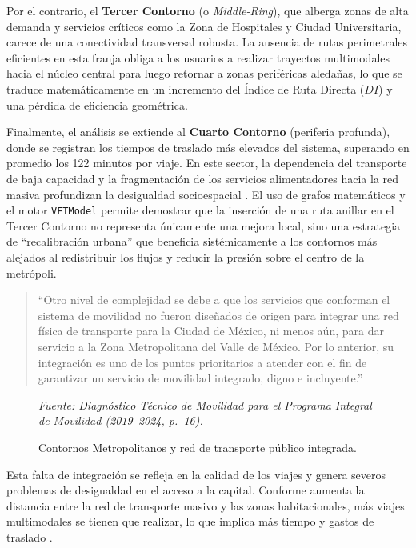 Por el contrario, el \textbf{Tercer Contorno} (o \textit{Middle-Ring}), que alberga zonas de alta demanda y 
servicios críticos como la Zona de Hospitales y Ciudad Universitaria, carece de una conectividad transversal robusta. 
La ausencia de rutas perimetrales eficientes en esta franja obliga a los usuarios a realizar trayectos multimodales hacia el núcleo central
para luego retornar a zonas periféricas aledañas, lo que se traduce matemáticamente en un incremento del Índice de Ruta Directa ($DI$) 
y una pérdida de eficiencia geométrica.

Finalmente, el análisis se extiende al \textbf{Cuarto Contorno} (periferia profunda), donde se registran los tiempos de traslado más elevados del sistema, 
superando en promedio los 122 minutos por viaje. En este sector, la dependencia del transporte de baja capacidad y la fragmentación de los servicios alimentadores 
hacia la red masiva profundizan la desigualdad socioespacial \textcite{semovi2020diagnostico}. El uso de grafos matemáticos y el motor \texttt{VFTModel} 
permite demostrar que la inserción de una ruta anillar en el Tercer Contorno no representa únicamente una mejora local, sino una estrategia de ``recalibración urbana''
que beneficia sistémicamente a los contornos más alejados al redistribuir los flujos y reducir la presión sobre el centro de la metrópoli.


\begin{quote}
``Otro nivel de complejidad se debe a que los servicios que conforman el sistema de
movilidad no fueron diseñados de origen para integrar una red física de transporte
para la Ciudad de México, ni menos aún, para dar servicio a la Zona Metropolitana
del Valle de México. Por lo anterior, su integración es uno de los puntos prioritarios
a atender con el fin de garantizar un servicio de movilidad integrado, digno e
incluyente.'' \parencite[p.~XX]{semovi2020diagnostico}
\end{quote}


\begin{figure}[htbp]
    \centering
    \caption[Contornos Metropolitanos]{Contornos Metropolitanos y red de transporte
    público integrada.}
    \label{fig:semovi-contornos}
    \small\textit{Fuente: Diagnóstico Técnico de Movilidad para el Programa Integral de
    Movilidad (2019--2024, p.~16).}
\end{figure}

Esta falta de integración se refleja en la calidad de los viajes y genera severos
problemas de desigualdad en el acceso a la capital. Conforme aumenta la distancia
entre la red de transporte masivo y las zonas habitacionales, más viajes multimodales
se tienen que realizar, lo que implica más tiempo y gastos de traslado
\parencite{semovi2020diagnostico}.

